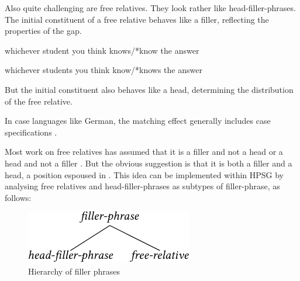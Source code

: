 \documentclass[output=paper
                ,modfonts
                ,nonflat
	        ,collection
	        ,collectionchapter
	        ,collectiontoclongg
 	        ,biblatex
                ,babelshorthands
                ,newtxmath
                ,draftmode
                ,colorlinks, citecolor=brown
]{./langsci/langscibook}
\begin{document}
{Also quite challenging are free relatives. They look rather like
head-filler-phrases. The initial constituent of a free relative behaves
like a filler, reflecting the properties of the gap.

\begin{exe}
\ex \label{ex:UDC:63}
whichever student you think knows/*know the answer
\end{exe}

\begin{exe}
\ex \label{ex:UDC:64}
whichever students you think know/*knows the answer
\end{exe}

\noindent
But the initial constituent also behaves like a head, determining the
distribution of the free relative.

\begin{exe}
\ex \label{ex:UDC:65}
\begin{xlist}
  
\end{xlist}
\end{exe}


\begin{exe}
\ex \label{ex:UDC:66}
\begin{xlist}
\end{xlist}
\end{exe}

\noindent
In case languages like German, the matching effect generally includes case
specifications \citep{Mueller:99a}. %

Most work on free relatives has
assumed that it is a filler and not a head
\citep{Groos:Riemsdijk:81,Grosu:2003} or a head and not a filler
\citep{Bresnan:Grimshaw:78}. But the obvious suggestion is that it is
both a filler and a head, a position espoused in
\citet{Huddleston02}. This idea can be implemented within HPSG by
analysing free relatives and head-filler-phrases as subtypes of
filler-phrase, as follows:


\begin{figure}[htb]
  \centering

  \includegraphics{figures/BB-filler-phrase-crop}
  \caption{\label{fig:UDC:67}Hierarchy of filler phrases}
  

\end{figure}}
\end{document}
